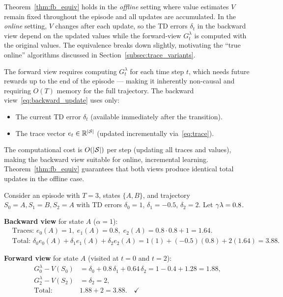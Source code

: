 \documentclass[11pt,a4paper]{article}
\begin{document}
\begin{remark}
\label{rem:offline}
Theorem~\ref{thm:fb_equiv} holds in the \emph{offline} setting where
value estimates $V$ remain fixed throughout the episode and all updates
are accumulated. In the \emph{online} setting, $V$ changes after each
update, so the TD errors $\delta_t$ in the backward view depend on the
updated values while the forward-view $G_t^\lambda$ is computed with
the original values. The equivalence breaks down slightly, motivating
the ``true online'' algorithms discussed in
Section~\ref{subsec:trace_variants}.
\end{remark}

\begin{rlconnection}[title={Computational Advantage of the Backward View}]
The forward view requires computing $G_t^\lambda$ for each time step
$t$, which needs future rewards up to the end of the episode --- making
it inherently non-causal and requiring $O(T)$ memory for the full
trajectory. The backward view~\eqref{eq:backward_update} uses only:
\begin{itemize}[nosep]
  \item The current TD error $\delta_t$ (available immediately after
    the transition).
  \item The trace vector $e_t \in \mathbb{R}^{|\mathcal{S}|}$ (updated
    incrementally via~\eqref{eq:trace}).
\end{itemize}
The computational cost is $O(|\mathcal{S}|)$ per step (updating all traces
and values), making the backward view suitable for online, incremental
learning. Theorem~\ref{thm:fb_equiv} guarantees that both views
produce identical total updates in the offline case.
\end{rlconnection}

\begin{example}
\label{ex:fb_verify}
Consider an episode with $T = 3$, states $\{A, B\}$, and trajectory
$S_0 = A, S_1 = B, S_2 = A$ with TD errors $\delta_0 = 1$,
$\delta_1 = -0.5$, $\delta_2 = 2$. Let $\gamma\lambda = 0.8$.

\textbf{Backward view} for state $A$ ($\alpha = 1$):
\begin{align*}
  &\text{Traces: }
  e_0(A) = 1,\;
  e_1(A) = 0.8,\;
  e_2(A) = 0.8 \cdot 0.8 + 1 = 1.64. \\
  &\text{Total: }
  \delta_0 e_0(A) + \delta_1 e_1(A) + \delta_2 e_2(A)
  = 1(1) + (-0.5)(0.8) + 2(1.64) = 3.88.
\end{align*}

\textbf{Forward view} for state $A$ (visited at $t = 0$ and $t = 2$):
\begin{align*}
  G_0^\lambda - V(S_0) &= \delta_0 + 0.8\,\delta_1
    + 0.64\,\delta_2
    = 1 - 0.4 + 1.28 = 1.88, \\
  G_2^\lambda - V(S_2) &= \delta_2 = 2, \\
  \text{Total: } &1.88 + 2 = 3.88. \quad\checkmark
\end{align*}
\end{example}
\end{document}
